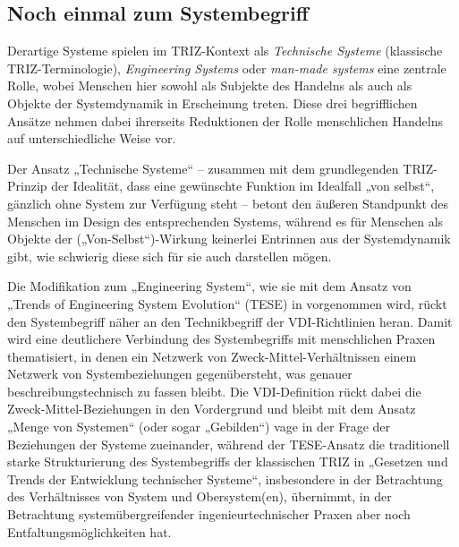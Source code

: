 \documentclass[11pt,a4paper]{article}
\begin{document}
\subsection{Noch einmal zum Systembegriff}

Derartige Systeme spielen im TRIZ-Kontext als \emph{Technische Systeme}
(klassische TRIZ-Termi\-nologie), \emph{Engineering Systems} oder
\emph{man-made systems} \cite{Souchkov2014} eine zentrale Rolle, wobei
Menschen hier sowohl als Subjekte des Handelns als auch als Objekte der
Systemdynamik in Erscheinung treten. Diese drei begriff\-lichen Ansätze nehmen
dabei ihrerseits Reduktionen der Rolle menschlichen Handelns auf
unterschiedliche Weise vor.

Der Ansatz „Technische Systeme“ -- zusammen mit dem grundlegenden TRIZ-Prinzip
der Idealität, dass eine gewünschte Funktion im Idealfall „von selbst“,
gänzlich ohne System zur Verfügung steht -- betont den äußeren Standpunkt des
Menschen im Design des entsprechenden Systems, während es für Menschen als
Objekte der („Von-Selbst“)-Wirkung keinerlei Entrinnen aus der Systemdynamik
gibt, wie schwierig diese sich für sie auch darstellen mögen.

Die Modifikation zum „Engineering System“, wie sie mit dem Ansatz von „Trends
of Engineering System Evolution“ (TESE) in \cite{TESE2018} vorgenommen wird,
rückt den Systembegriff näher an den Technikbegriff der VDI-Richtlinien heran.
Damit wird eine deutlichere Verbindung des Systembegriffs mit menschlichen
Praxen thematisiert, in denen ein Netzwerk von Zweck-Mittel-Verhältnissen
einem Netzwerk von Systembeziehungen gegenübersteht, was genauer
beschreibungstechnisch zu fassen bleibt. Die VDI-Definition rückt dabei die
Zweck-Mittel-Beziehungen in den Vordergrund und bleibt mit dem Ansatz „Menge
von Systemen“ (oder sogar „Gebilden“) vage in der Frage der Beziehungen der
Systeme zueinander, während der TESE-Ansatz die traditionell starke
Strukturierung des Systembegriffs der klassischen TRIZ in „Gesetzen und Trends
der Entwicklung technischer Systeme“, insbesondere in der Betrachtung des
Verhältnisses von System und Obersystem(en), übernimmt, in der Betrachtung
systemübergreifender ingenieurtechnischer Praxen aber noch
Entfaltungsmöglichkeiten hat.
\end{document}
